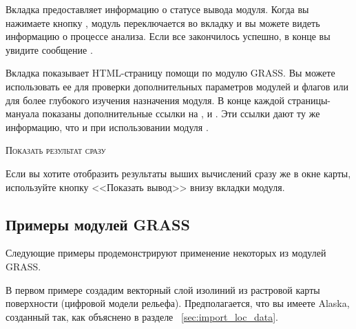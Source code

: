 
Вкладка  предоставляет информацию о статусе вывода модуля.
Когда вы нажимаете кнопку , модуль переключается во
вкладку  и вы можете видеть информацию о процессе анализа.
Если все закончилось успешно, в конце вы увидите сообщение
.


Вкладка  показывает HTML-страницу помощи по модулю GRASS.
Вы можете использовать ее для проверки дополнительных параметров модулей
и флагов или для более глубокого изучения назначения модуля. В конце
каждой страницы-мануала показаны дополнительные ссылки на
,  и
. Эти ссылки дают ту же информацию, что и при
использовании модуля .

\begin{Tip}\caption{\textsc{Показать результат сразу}}
Если вы хотите отобразить результаты выших вычислений сразу же в окне
карты, используйте кнопку <<Показать вывод>> внизу вкладки модуля.
\end{Tip}

\subsection{Примеры модулей GRASS}

Следующие примеры продемонстрируют применение некоторых из модулей GRASS.


В первом примере создадим векторный слой изолиний из растровой карты
поверхности (цифровой модели рельефа). Предполагается, что вы имеете
 Alaska, созданный так, как объяснено в разделе~
\ref{sec:import_loc_data}.


